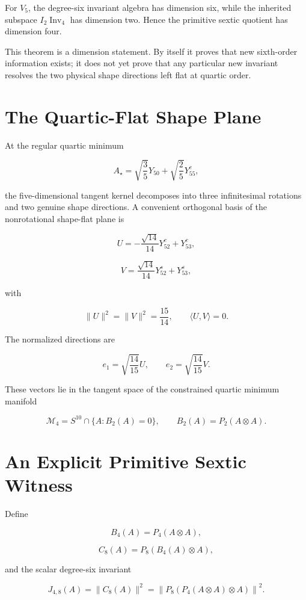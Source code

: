 \begin{theorem}
For $V_5$, the degree-six invariant algebra has dimension six, while the inherited subspace $I_2\operatorname{Inv}_4$ has dimension two. Hence the primitive sextic quotient has dimension four.
\end{theorem}

This theorem is a dimension statement. By itself it proves that new sixth-order information exists; it does not yet prove that any particular new invariant resolves the two physical shape directions left flat at quartic order.

\section{The Quartic-Flat Shape Plane}

At the regular quartic minimum

\[
A_\star=\sqrt{\frac35}Y_{50}+\sqrt{\frac25}Y^c_{55},
\]

the five-dimensional tangent kernel decomposes into three infinitesimal rotations and two genuine shape directions. A convenient orthogonal basis of the nonrotational shape-flat plane is

\[
U=-\frac{\sqrt{14}}{14}Y^c_{52}+Y^c_{53},
\]

\[
V=\frac{\sqrt{14}}{14}Y^s_{52}+Y^s_{53},
\]

with

\[
\|U\|^2=\|V\|^2=\frac{15}{14},
\qquad
\langle U,V\rangle=0.
\]

The normalized directions are

\[
e_1=\sqrt{\frac{14}{15}}U,
\qquad
e_2=\sqrt{\frac{14}{15}}V.
\]

These vectors lie in the tangent space of the constrained quartic minimum manifold

\[
\mathcal M_4=S^{10}\cap\{A:B_2(A)=0\},
\qquad
B_2(A)=P_2(A\otimes A).
\]

\section{An Explicit Primitive Sextic Witness}

Define

\[
B_4(A)=P_4(A\otimes A),
\]

\[
C_8(A)=P_8(B_4(A)\otimes A),
\]

and the scalar degree-six invariant

\[
\boxed{
J_{4,8}(A)=\|C_8(A)\|^2
=\left\|P_8\left(P_4(A\otimes A)\otimes A\right)\right\|^2.
}
\]

